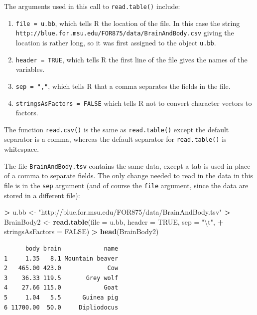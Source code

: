 \documentclass[]{krantz}
\makeatletter
\newenvironment{Shaded}{\begin{snugshade}}{\end{snugshade}}
\newcommand{\KeywordTok}[1]{\textcolor[rgb]{0.27,0.27,0.27}{\textbf{#1}}}
\newcommand{\DataTypeTok}[1]{\textcolor[rgb]{0.27,0.27,0.27}{#1}}
\newcommand{\CharTok}[1]{\textcolor[rgb]{0.5,0.5,0.5}{#1}}
\newcommand{\StringTok}[1]{\textcolor[rgb]{0.5,0.5,0.5}{#1}}
\newcommand{\OtherTok}[1]{\textcolor[rgb]{0.37,0.37,0.37}{#1}}
\newcommand{\OperatorTok}[1]{\textcolor[rgb]{0.43,0.43,0.43}{\textbf{#1}}}
\newcommand{\NormalTok}[1]{#1}
\providecommand{\tightlist}{%
  \setlength{\itemsep}{0pt}\setlength{\parskip}{0pt}}
\newenvironment{kframe}{%
\medskip{}
\setlength{\fboxsep}{.8em}
 \def\at@end@of@kframe{}%
 \ifinner\ifhmode%
  \def\at@end@of@kframe{\end{minipage}}%
  \begin{minipage}{\columnwidth}%
 \fi\fi%
 \def\FrameCommand##1{\hskip\@totalleftmargin \hskip-\fboxsep
 \colorbox{shadecolor}{##1}\hskip-\fboxsep
     \hskip-\linewidth \hskip-\@totalleftmargin \hskip\columnwidth}%
 \MakeFramed {\advance\hsize-\width
   \@totalleftmargin\z@ \linewidth\hsize
   \@setminipage}}%
 {\par\unskip\endMakeFramed%
 \at@end@of@kframe}
\renewenvironment{Shaded}{\begin{kframe}}{\end{kframe}}
\makeatother
\begin{document}
The arguments used in this call to \texttt{read.table()} include:

\begin{enumerate}
\def\labelenumi{\arabic{enumi}.}
\tightlist
\item
  \texttt{file\ =\ u.bb}, which tells R the location of the file. In
  this case the string
  \texttt{http://blue.for.msu.edu/FOR875/data/BrainAndBody.csv} giving
  the location is rather long, so it was first assigned to the object
  \texttt{u.bb}.
\item
  \texttt{header\ =\ TRUE}, which tells R the first line of the file
  gives the names of the variables.
\item
  \texttt{sep\ =\ ","}, which tells R that a comma separates the fields
  in the file.
\item
  \texttt{stringsAsFactors\ =\ FALSE} which tells R not to convert
  character vectors to factors.
\end{enumerate}

The function \texttt{read.csv()} is the same as \texttt{read.table()}
except the default separator is a comma, whereas the default separator
for \texttt{read.table()} is whitespace.

The file \texttt{BrainAndBody.tsv} contains the same data, except a tab
is used in place of a comma to separate fields. The only change needed
to read in the data in this file is in the \texttt{sep} argument (and of
course the \texttt{file} argument, since the data are stored in a
different file):

\begin{Shaded}
\begin{Highlighting}[]
\OperatorTok{>}\StringTok{ }\NormalTok{u.bb <-}\StringTok{ "http://blue.for.msu.edu/FOR875/data/BrainAndBody.tsv"}
\OperatorTok{>}\StringTok{ }\NormalTok{BrainBody2 <-}\StringTok{ }\KeywordTok{read.table}\NormalTok{(}\DataTypeTok{file =}\NormalTok{ u.bb, }\DataTypeTok{header =} \OtherTok{TRUE}\NormalTok{, }\DataTypeTok{sep =} \StringTok{"}\CharTok{\textbackslash{}t}\StringTok{"}\NormalTok{, }
\OperatorTok{+}\StringTok{                          }\DataTypeTok{stringsAsFactors =} \OtherTok{FALSE}\NormalTok{)}
\OperatorTok{>}\StringTok{ }\KeywordTok{head}\NormalTok{(BrainBody2)}
\end{Highlighting}
\end{Shaded}

\begin{verbatim}
      body brain            name
1     1.35   8.1 Mountain beaver
2   465.00 423.0             Cow
3    36.33 119.5       Grey wolf
4    27.66 115.0            Goat
5     1.04   5.5      Guinea pig
6 11700.00  50.0     Dipliodocus
\end{verbatim}
\end{document}
